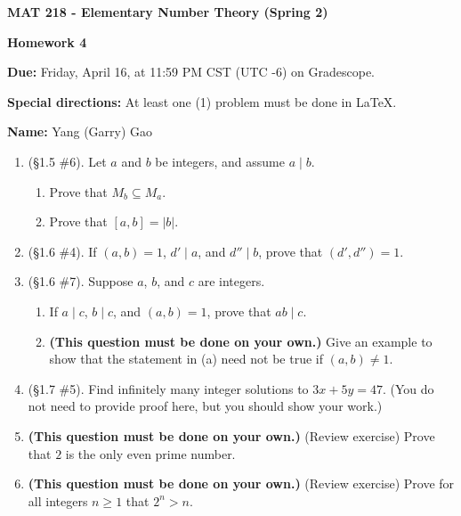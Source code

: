 \documentclass[11pt,a4paper]{article}
\begin{document}
\begin{Large}
\centerline{\bf MAT 218 - Elementary Number Theory (Spring 2)}\medskip
\centerline{\bf Homework 4}\medskip
\end{Large}
{\bf Due:} Friday, April 16, at 11:59 PM CST (UTC -6) on Gradescope.

{\bf Special directions:} At least one (1) problem must be done in \LaTeX.

{\bf Name:} Yang (Garry) Gao


\hrulefill

\begin{enumerate}

	\item (\S 1.5 \#6). Let \(a\) and \(b\) be integers, and assume \(a \mid b\).
		\begin{enumerate}
			\item Prove that \(M_{b} \subseteq M_{a}\).
			\item Prove that \( \left[a,b\right] = |b| \).
		\end{enumerate}

	\item (\S 1.6 \#4). If \((a,b)=1\), \(d' \mid a\), and \(d'' \mid b\), prove that \((d',d'')=1\).

	\item (\S 1.6 \#7). Suppose \(a\), \(b\), and \(c\) are integers.
	\begin{enumerate}
		\item If \(a \mid c\), \(b \mid c\), and \((a,b)=1\), prove that \(ab \mid c\).
		\item \textbf{(This question must be done on your own.)} Give an example to show that the statement in (a) need not be true if \((a,b) \ne 1\).
	\end{enumerate}

	\item (\S 1.7 \#5). Find infinitely many integer solutions to \(3x+5y=47\). (You do not need to provide proof here, but you should show your work.)

	\item \textbf{(This question must be done on your own.)} (Review exercise) Prove that \(2\) is the only even prime number.

	\item \textbf{(This question must be done on your own.)} (Review exercise) Prove for all integers \(n \ge 1\) that \(2^{n} > n\).


\end{enumerate}
\end{document}
